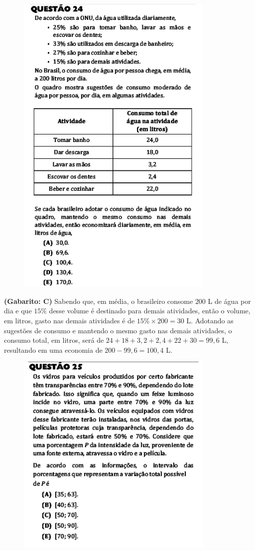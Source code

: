 \documentclass[a4paper]{article}
\begin{document}
\begin{figure}[H]
	\begin{center}
		\includegraphics[width=9.5cm]{L3Q24.png}
	\end{center}
\end{figure}
\par\textbf{(Gabarito: C)} Sabendo que, em média, o brasileiro consome $200$ L de água por dia e que $15\%$ desse volume é destinado para demais atividades, então o volume, em litros, gasto nas demais atividades é de $15\%\times 200 = 30$ L. Adotando as sugestões de consumo e mantendo o mesmo gasto nas demais atividades, o consumo total, em litros, será de $24+18+3,2+2,4+22+30 = 99,6$ L, resultando em uma economia de $200 - 99,6 = 100,4$ L.
\begin{figure}[H]
	\begin{center}
		\includegraphics[width=9.5cm]{L3Q25.png}
	\end{center}
\end{figure}
\end{document}
